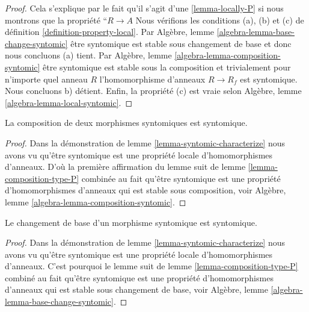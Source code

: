 \begin{proof}

Cela s'explique par le fait qu'il s'agit d'une \ref{lemma-locally-P} si nous montrons que la propriété ``$R \to A$ Nous vérifions les conditions (a), (b) et (c) de définition
\ref{definition-property-local}. Par Algèbre, lemme \ref{algebra-lemma-base-change-syntomic}
être syntomique est stable sous changement de base et donc nous concluons (a) tient. Par Algèbre, lemme \ref{algebra-lemma-composition-syntomic}
être syntomique est stable sous la composition et trivialement pour n'importe quel anneau
$R$ l'homomorphisme d'anneaux $R \to R_f$ est syntomique. Nous concluons b) détient. Enfin, la propriété (c) est vraie selon Algèbre, lemme \ref{algebra-lemma-local-syntomic}.

\end{proof}

\begin{lemma}

\label{lemma-composition-syntomic}

La composition de deux morphismes syntomiques est syntomique.

\end{lemma}

\begin{proof}
Dans la démonstration de lemme \ref{lemma-syntomic-characterize} nous avons vu qu'être syntomique est une propriété locale d'homomorphismes d'anneaux. D'où la première affirmation du lemme suit de lemme \ref{lemma-composition-type-P} combinée au fait qu'être syntomique est une propriété d'homomorphismes d'anneaux qui est stable sous composition, voir Algèbre, lemme \ref{algebra-lemma-composition-syntomic}.
\end{proof}

\begin{lemma}

\label{lemma-base-change-syntomic}

Le changement de base d'un morphisme syntomique est syntomique.

\end{lemma}

\begin{proof}
Dans la démonstration de lemme \ref{lemma-syntomic-characterize} nous avons vu qu'être syntomique est une propriété locale d'homomorphismes d'anneaux. C'est pourquoi le lemme suit de lemme \ref{lemma-composition-type-P} combiné au fait qu'être syntomique est une propriété d'homomorphismes d'anneaux qui est stable sous changement de base, voir Algèbre, lemme \ref{algebra-lemma-base-change-syntomic}.
\end{proof}

